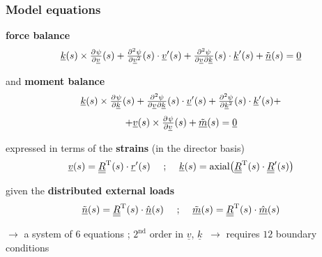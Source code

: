 \begin{frame}
  \frametitle{Model equations}
  
  \textbf{force balance}
  \begin{displaymath}
    \underline{k}(s) \times \pd{\psi}{\underline{v}}(s) +
    \pd[2]{\psi}{\underline{v}}(s) \cdot \underline{v}^{\prime}(s) +
    \md{\psi}{2}{\underline{v}}{}{\underline{k}}{}(s) \cdot \underline{k}^{\prime}(s) +
    \underline{\tilde{n}}(s) =
    \underline{0}
  \end{displaymath}
  
  \vspace{0.3em}
  and \textbf{moment balance}
  \begin{displaymath}
    \underline{k}(s) \times \pd{\psi}{\underline{k}}(s) +
    \md{\psi}{2}{\underline{v}}{}{\underline{k}}{}(s) \cdot \underline{v}^{\prime}(s) +
    \pd[2]{\psi}{\underline{k}}(s) \cdot \underline{k}^{\prime}(s) +
  \end{displaymath}
  \begin{displaymath}
    + \underline{v}(s) \times \pd{\psi}{\underline{v}}(s) +
    \underline{\tilde{m}}(s) =
    \underline{0}
  \end{displaymath}
  
  \vspace{0.3em}
  expressed in terms of the \textbf{strains} (in the director basis)
  \begin{displaymath}
    \underline{v}(s) =
    \underline{\underline{R}}^{\mathrm{T}}(s) \cdot \underline{r}^{\prime}(s)
    \quad \text{ ; } \quad
    \underline{k}(s) =
    \mathrm{axial} \bigl(
    \underline{\underline{R}}^{\mathrm{T}}(s) \cdot \underline{\underline{R}}^{\prime}(s)
    \bigr)
  \end{displaymath}
  
  \vspace{0.3em}
  given the \textbf{distributed external loads}
  \begin{displaymath}
    \underline{\tilde{n}}(s) =
    \underline{\underline{R}}^{\mathrm{T}}(s) \cdot \underline{\hat{n}}(s)
    \quad \text{ ; } \quad
    \underline{\tilde{m}}(s) =
    \underline{\underline{R}}^{\mathrm{T}}(s) \cdot \underline{\hat{m}}(s)
  \end{displaymath}
  
  \vspace{0.2em}
  $\rightarrow$ a system of $6$ equations ; $2^{\text{nd}}$ order in $\underline{v}$, $\underline{k}$
  $\: \rightarrow$ requires $12$ boundary conditions
\end{frame}

